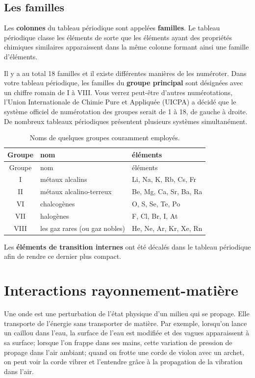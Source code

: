 \documentclass[
  11pt,
  a4paper,
  openany]{book}
\begin{document}
\subsection{Les familles}\label{les-familles}

Les \textbf{colonnes} du tableau périodique sont appelées \textbf{familles}. Le tableau périodique classe les éléments de sorte que les éléments ayant des propriétés chimiques similaires apparaissent dans la même colonne formant ainsi une famille d'éléments.

Il y a au total 18 familles et il existe différentes manières de les numéroter. Dans votre tableau périodique, les familles du \textbf{groupe principal} sont désignées avec un chiffre romain de I à VIII. Vous verrez peut-être d'autres numérotations, l'Union Internationale de Chimie Pure et Appliquée (UICPA) a décidé que le système officiel de numérotation des groupes serait de 1 à 18, de gauche à droite. De nombreux tableaux périodiques présentent plusieurs systèmes simultanément.

\begin{longtable}[]{@{}cll@{}}
\caption{\label{tab:noms-groupes-courants} Noms de quelques groupes couramment employés.}\tabularnewline
\toprule\noalign{}
Groupe & nom & éléments \\
\midrule\noalign{}
\endfirsthead
\toprule\noalign{}
Groupe & nom & éléments \\
\midrule\noalign{}
\endhead
\bottomrule\noalign{}
\endlastfoot
I & métaux alcalins & Li, Na, K, Rb, Cs, Fr \\
II & métaux alcalino-terreux & Be, Mg, Ca, Sr, Ba, Ra \\
VI & chalcogènes & O, S, Se, Te, Po \\
VII & halogènes & F, Cl, Br, I, At \\
VIII & les gaz rares (ou gaz nobles) & He, Ne, Ar, Kr, Xe, Rn \\
\end{longtable}

Les \textbf{éléments de transition internes} ont été décalés dans le tableau périodique afin de rendre ce dernier plus compact.

\newpage

\section{Interactions rayonnement-matière}\label{interactions-rayonnement-matiuxe8re}

Une onde est une perturbation de l'état physique d'un milieu qui se propage. Elle transporte de l'énergie sans transporter de matière. Par exemple, lorsqu'on lance un caillou dans l'eau, la surface de l'eau est modifiée et des vagues apparaissent à sa surface; lorsque l'on frappe dans ses mains, cette variation de pression de propage dans l'air ambiant; quand on frotte une corde de violon avec un archet, on peut voir la corde vibrer et l'entendre grâce à la propagation de la vibration dans l'air.
\end{document}
